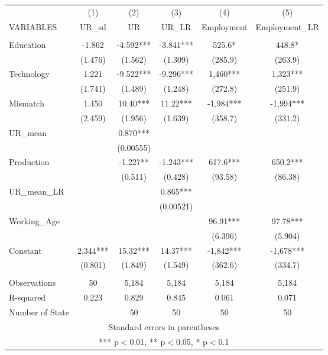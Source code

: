 \documentclass[]{article}
\begin{document}
\begin{tabular}{lccccc} \hline
 & (1) & (2) & (3) & (4) & (5) \\
VARIABLES & UR\_sd & UR & UR\_LR & Employment & Employment\_LR \\ \hline
 &  &  &  &  &  \\
Education & -1.862 & -4.592*** & -3.841*** & 525.6* & 448.8* \\
 & (1.476) & (1.562) & (1.309) & (285.9) & (263.9) \\
Technology & 1.221 & -9.522*** & -9.296*** & 1,460*** & 1,323*** \\
 & (1.741) & (1.489) & (1.248) & (272.8) & (251.9) \\
Mismatch & 1.450 & 10.40*** & 11.22*** & -1,984*** & -1,994*** \\
 & (2.459) & (1.956) & (1.639) & (358.7) & (331.2) \\
UR\_mean &  & 0.870*** &  &  &  \\
 &  & (0.00555) &  &  &  \\
Production &  & -1.227** & -1.243*** & 617.6*** & 650.2*** \\
 &  & (0.511) & (0.428) & (93.58) & (86.38) \\
UR\_mean\_LR &  &  & 0.865*** &  &  \\
 &  &  & (0.00521) &  &  \\
Working\_Age &  &  &  & 96.91*** & 97.78*** \\
 &  &  &  & (6.396) & (5.904) \\
Constant & 2.344*** & 15.32*** & 14.37*** & -1,842*** & -1,678*** \\
 & (0.801) & (1.849) & (1.549) & (362.6) & (334.7) \\
 &  &  &  &  &  \\
Observations & 50 & 5,184 & 5,184 & 5,184 & 5,184 \\
R-squared & 0.223 & 0.829 & 0.845 & 0.061 & 0.071 \\
 Number of State &  & 50 & 50 & 50 & 50 \\ \hline
\multicolumn{6}{c}{ Standard errors in parentheses} \\
\multicolumn{6}{c}{ *** p$<$0.01, ** p$<$0.05, * p$<$0.1} \\
\end{tabular}
\end{document}
